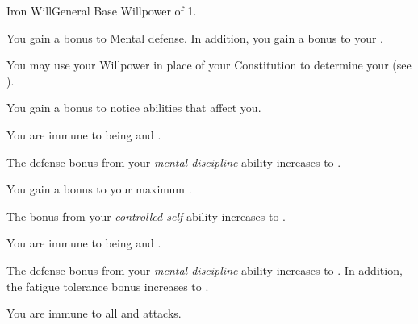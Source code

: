     \begin{feat}{Iron Will}{General}
        \featpre Base Willpower of 1.

         You gain a  bonus to Mental defense.
        In addition, you gain a  bonus to your .

         You may use your Willpower in place of your Constitution to determine your  (see ).

         You gain a  bonus to notice  abilities that affect you.

         You are immune to being \dazed and \stunned.

         The defense bonus from your \textit{mental discipline} ability increases to .

         You gain a  bonus to your maximum .

         The bonus from your \textit{controlled self} ability increases to .

         You are immune to being \disoriented and \confused.

         The defense bonus from your \textit{mental discipline} ability increases to .
        In addition, the fatigue tolerance bonus increases to .

         You are immune to all  and  attacks.
    \end{feat}

